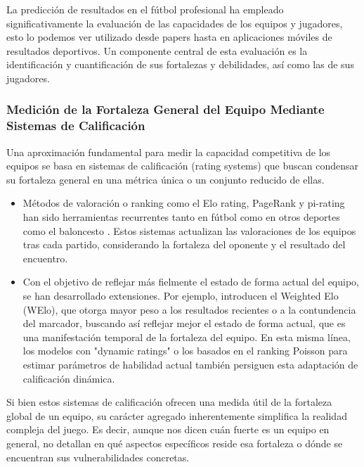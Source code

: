 La predicción de resultados en el fútbol profesional ha empleado significativamente la evaluación de las capacidades de los equipos y jugadores, esto lo podemos ver utilizado desde papers hasta en aplicaciones móviles de resultados deportivos. Un componente central de esta evaluación es la identificación y cuantificación de sus fortalezas y debilidades, así como las de sus jugadores.

\subsubsection{Medición de la Fortaleza General del Equipo Mediante Sistemas de Calificación}

Una aproximación fundamental para medir la capacidad competitiva de los equipos se basa en sistemas de calificación (rating systems) que buscan condensar su fortaleza general en una métrica única o un conjunto reducido de ellas.

\begin{itemize}

    \item Métodos de valoración o ranking como el Elo rating, PageRank y pi-rating han sido herramientas recurrentes tanto en fútbol \cite{macleanReviewNFL20192022, owenDynamicBayesianForecasting2011} como en otros deportes como el baloncesto \cite{lampisPredictionsEuropeanBasketball2023}. Estos sistemas actualizan las valoraciones de los equipos tras cada partido, considerando la fortaleza del oponente y el resultado del encuentro.

    \item Con el objetivo de reflejar más fielmente el estado de forma actual del equipo, se han desarrollado extensiones. Por ejemplo, \cite{angeliniWeightedEloRating2022} introducen el Weighted Elo (WElo), que otorga mayor peso a los resultados recientes o a la contundencia del marcador, buscando así reflejar mejor el estado de forma actual, que es una manifestación temporal de la fortaleza del equipo. En esta misma línea, los modelos con "dynamic ratings" \cite{holmesForecastingFootballMatch2024} o los basados en el ranking Poisson para estimar parámetros de habilidad actual \cite{leyRankingSoccerTeams2019} también persiguen esta adaptación de calificación dinámica.
\end{itemize}

Si bien estos sistemas de calificación ofrecen una medida útil de la fortaleza global de un equipo, su carácter agregado inherentemente simplifica la realidad compleja del juego. Es decir, aunque nos dicen cuán fuerte es un equipo en general, no detallan en qué aspectos específicos reside esa fortaleza o dónde se encuentran sus vulnerabilidades concretas.
